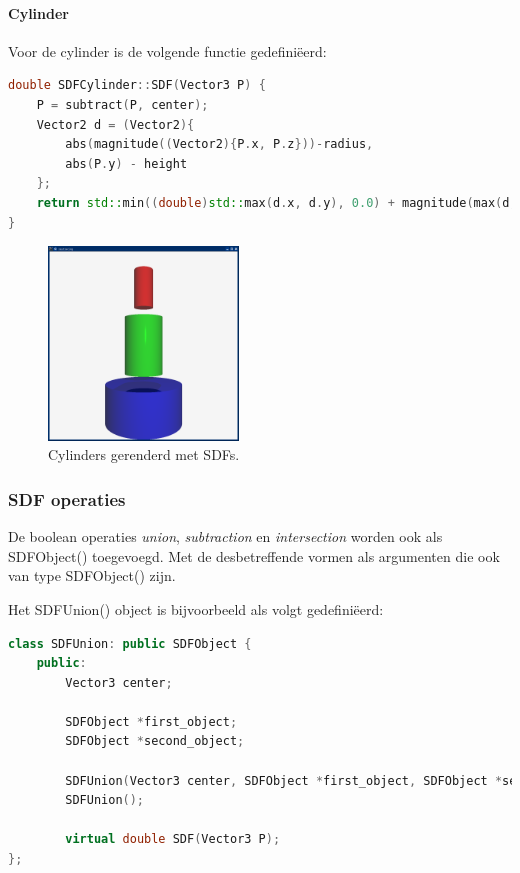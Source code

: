 \documentclass[12pt, a4paper]{article}
\begin{document}
\paragraph{Cylinder}
Voor de cylinder is de volgende functie gedefiniëerd:
\begin{lstlisting}[language=C++]
double SDFCylinder::SDF(Vector3 P) {
    P = subtract(P, center);
    Vector2 d = (Vector2){
        abs(magnitude((Vector2){P.x, P.z}))-radius,
        abs(P.y) - height
    };
    return std::min((double)std::max(d.x, d.y), 0.0) + magnitude(max(d, 0.0));
}
\end{lstlisting}


\begin{figure}[H]
    \centering
    \includegraphics[width=0.45\textwidth]{renders/cylinders.png}
    \caption{Cylinders gerenderd met SDFs.}
    \label{fig:cylinders}
\end{figure}


\subsubsection{SDF operaties}

De boolean operaties \emph{union}, \emph{subtraction} en \emph{intersection} worden ook als SDFObject() toegevoegd. Met de desbetreffende vormen als argumenten die ook van type SDFObject() zijn.

Het SDFUnion() object is bijvoorbeeld als volgt gedefiniëerd:

\begin{lstlisting}[language=C++]
class SDFUnion: public SDFObject {
    public:
        Vector3 center;
        
        SDFObject *first_object;
        SDFObject *second_object;

        SDFUnion(Vector3 center, SDFObject *first_object, SDFObject *second_object, ObjectMaterial material);
        SDFUnion();

        virtual double SDF(Vector3 P);
};
\end{lstlisting}
\end{document}
